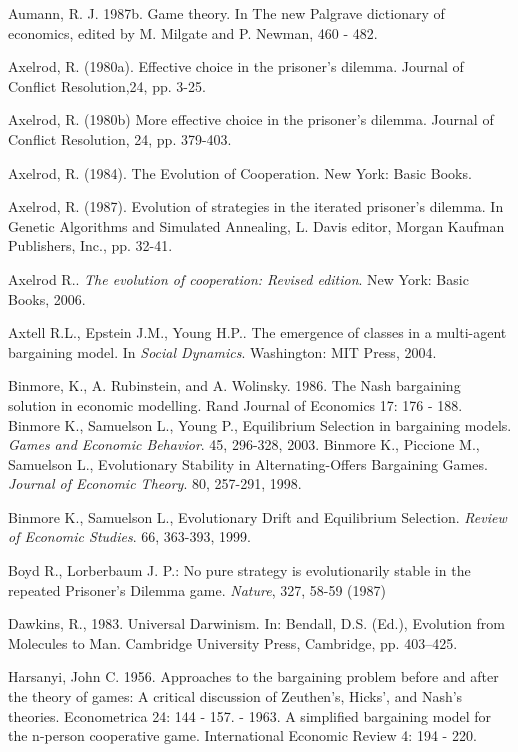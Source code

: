 \documentclass[12.5pt]{report}
\begin{document}
\begin{thebibliography}{}

 Aumann, R. J. 1987b. Game theory. In The new Palgrave dictionary of economics, edited by M. Milgate and P. Newman, 460 - 482.

 Axelrod, R. (1980a). Effective choice in the prisoner’s dilemma. Journal of Conflict Resolution,24, pp. 3-25.

 Axelrod, R. (1980b) More effective choice in the prisoner’s dilemma. Journal of Conflict Resolution, 24, pp. 379-403.

Axelrod, R. (1984). The Evolution of Cooperation. New York: Basic Books.

Axelrod, R. (1987). Evolution of strategies in the iterated prisoner’s dilemma. In Genetic Algorithms and Simulated Annealing, L. Davis
editor, Morgan Kaufman Publishers, Inc., pp. 32-41.

 Axelrod R.. {\emph{The evolution of cooperation: Revised edition}}. New York: Basic Books, 2006. 

 Axtell R.L., Epstein J.M., Young H.P.. {The emergence of classes in a multi-agent bargaining model. In \emph{Social Dynamics}}. Washington: MIT Press, 2004. 

Binmore, K., A. Rubinstein, and A. Wolinsky. 1986. The Nash bargaining solution in
economic modelling. Rand Journal of Economics 17: 176 - 188.
 Binmore K., Samuelson L., Young P., Equilibrium Selection in bargaining models. {\emph{Games and Economic Behavior}}. 45, 296-328, 2003. 
 Binmore K., Piccione M., Samuelson L., Evolutionary Stability in Alternating-Offers Bargaining Games. {\emph{Journal of Economic Theory}}. 80, 257-291, 1998. 

 Binmore K., Samuelson L., Evolutionary Drift and Equilibrium Selection. {\emph{Review of Economic Studies}}. 66, 363-393, 1999. 

 Boyd R., Lorberbaum J. P.: No pure strategy is evolutionarily stable in the repeated Prisoner's Dilemma game. \emph{Nature}, 327, 58-59 (1987)

Dawkins, R., 1983. Universal Darwinism. In: Bendall, D.S. (Ed.), Evolution from Molecules to Man. Cambridge University Press, Cambridge, pp. 403–425.

 Harsanyi, John C. 1956. Approaches to the bargaining problem before and after the theory of games: A critical discussion of Zeuthen’s, Hicks’, and Nash’s theories. Econometrica 24: 144 - 157.
 - 1963. A simplified bargaining model for the n-person cooperative game. International Economic Review 4: 194 - 220.


\end{thebibliography}
\end{document}
